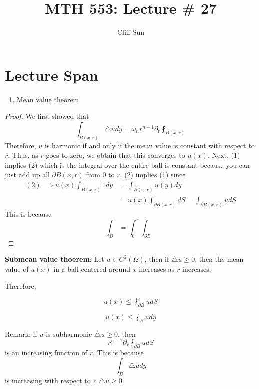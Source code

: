 \documentclass{article}
\title{MTH 553: Lecture \# 27}
\author{Cliff Sun}
\newtheorem{one minute paper}[theorem]{One Minute Paper}
\begin{document}
\maketitle

\section*{Lecture Span}
\begin{enumerate}
    \item Mean value theorem
\end{enumerate}

\begin{proof}
    We first showed that 
    \begin{equation}
        \int_{B(x,r)}\triangle u dy = \omega_n r^{n-1}\partial_{r}\fint_{B(x,r)}
    \end{equation}
    Therefore, $u$ is harmonic if and only if the mean value is constant with respect to $r$. Thus, as $r$ goes to zero, we obtain that this converges to $u(x)$. Next, (1) implies (2) which is the
    integral over the entire ball is constant because you can just add up all $\partial B(x,r)$ from 0 to $r$. (2) implies (1) since 
    \begin{align*}
        (2) \implies u(x)\int_{B(x,r)}1 dy &= \int_{B(x,r)}u(y)dy \\
        &= u(x)\int_{\partial B(x,r)}dS = \int_{\partial B(x,r)}u dS
    \end{align*}
    This is because 
    \begin{equation}
        \int_{B} = \int_{0}^{r}\int_{\partial B}
    \end{equation}
\end{proof}

\textbf{Submean value thoerem}: Let $u \in C^{2}(\Omega)$, then if $\triangle u \geq 0$, then the mean value of $u(x)$ in a ball centered around $x$ increases as $r$ increases.  

Therefore, 

\begin{equation}
    u(x) \leq \fint_{\partial B}u dS
\end{equation}

\begin{equation}
    u(x) \leq \fint_{B}udy
\end{equation}

Remark: if $u$ is subharmonic $\triangle u \geq 0$, then $$ r^{n-1}\partial_{r}\fint_{\partial B}u dS$$ is an increasing function of $r$. This is because $$\int_B \triangle u dy$$ is increasing with respect to $r$ $\triangle u \geq 0$. 
\end{document}
